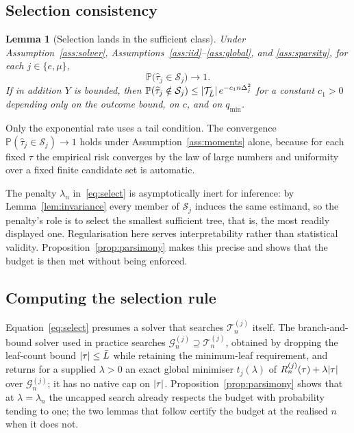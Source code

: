 \documentclass[11pt]{article}
\theoremstyle{plain}
\newtheorem{lemma}[theorem]{Lemma}
\theoremstyle{definition}
\theoremstyle{remark}
\newcommand{\PP}{\mathbb{P}}
\newcommand{\cT}{\mathcal{T}}
\newcommand{\cS}{\mathcal{S}}
\newcommand{\cG}{\mathcal{G}}
\newcommand{\that}{\widehat{\tau}}
\DeclarePairedDelimiter{\card}{\lvert}{\rvert}
\begin{document}
\subsection{Selection consistency}

\begin{lemma}[Selection lands in the sufficient class]\label{lem:selection}
Under Assumption~\ref{ass:solver}, Assumptions~\ref{ass:iid}--\ref{ass:global},
and \ref{ass:sparsity}, for
each $j\in\{e,\mu\}$,
\[
  \PP\bigl(\that_j\in\cS_j\bigr)\longrightarrow1 .
\]
If in addition $Y$ is bounded, then
$\PP(\that_j\notin\cS_j)\le\card{\cT_{\bar L}}\,e^{-c_1n\Delta_j^2}$ for a
constant $c_1>0$ depending only on the outcome bound, on $c$, and on
$q_{\min}$.
\end{lemma}

\noindent Only the exponential rate uses a tail condition. The convergence
$\PP(\that_j\in\cS_j)\to1$ holds under Assumption~\ref{ass:moments} alone,
because for each fixed $\tau$ the empirical risk converges by the law of large
numbers and uniformity over a fixed finite candidate set is automatic.

The penalty $\lambda_n$ in~\eqref{eq:select} is asymptotically inert for
inference: by Lemma~\ref{lem:invariance} every member of $\cS_j$ induces the
same estimand, so the penalty's role is to select the smallest sufficient tree,
that is, the most readily displayed one. Regularisation here serves
interpretability rather than statistical validity.
Proposition~\ref{prop:parsimony} makes this precise and shows that the budget
is then met without being enforced.

\subsection{Computing the selection rule}\label{sec:compute}

Equation~\eqref{eq:select} presumes a solver that searches $\cT^{(j)}_n$ itself.
The branch-and-bound solver used in practice searches
$\cG^{(j)}_n\supseteq\cT^{(j)}_n$, obtained by dropping the leaf-count bound
$\card\tau\le\bar L$ while retaining the minimum-leaf requirement, and returns
for a supplied $\lambda>0$ an exact global minimiser $t_j(\lambda)$ of
$R^{(j)}_n(\tau)+\lambda\card\tau$ over $\cG^{(j)}_n$; it has no native cap on
$\card\tau$. Proposition~\ref{prop:parsimony} shows that at $\lambda=\lambda_n$
the uncapped search already respects the budget with probability tending to
one; the two lemmas that follow certify the budget at the realised $n$ when it
does not.
\end{document}
